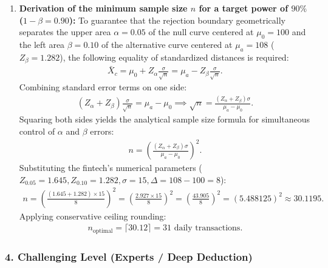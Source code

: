 \begin{solucion}
\begin{enumerate}
		\item \textbf{Derivation of the minimum sample size $n$ for a target power of $90\%$ ($1-\beta = 0.90$):}
		To guarantee that the rejection boundary geometrically separates the upper area $\alpha = 0.05$ of the null curve centered at $\mu_0 = 100$ and the left area $\beta = 0.10$ of the alternative curve centered at $\mu_a = 108$ ($Z_\beta = 1.282$), the following equality of standardized distances is required:
		\begin{align}
			\bar{X}_c = \mu_0 + Z_\alpha \frac{\sigma}{\sqrt{n}} = \mu_a - Z_\beta \frac{\sigma}{\sqrt{n}}.
		\end{align}
		Combining standard error terms on one side:
		\begin{align}
			(Z_\alpha + Z_\beta)\frac{\sigma}{\sqrt{n}} = \mu_a - \mu_0 \implies \sqrt{n} = \frac{(Z_\alpha + Z_\beta)\sigma}{\mu_a - \mu_0}.
		\end{align}
		Squaring both sides yields the analytical sample size formula for simultaneous control of $\alpha$ and $\beta$ errors:
		\begin{align}
			n = \left( \frac{(Z_\alpha + Z_\beta)\sigma}{\mu_a - \mu_0} \right)^2.
		\end{align}
		Substituting the fintech's numerical parameters ($Z_{0.05} = 1.645, Z_{0.10} = 1.282, \sigma = 15, \Delta = 108 - 100 = 8$):
		\begin{align}
			n = \left( \frac{(1.645 + 1.282) \times 15}{8} \right)^2 = \left( \frac{2.927 \times 15}{8} \right)^2 = \left( \frac{43.905}{8} \right)^2 = (5.488125)^2 \approx 30.1195.
		\end{align}
		Applying conservative ceiling rounding:
		\begin{align}
			n_{\text{optimal}} = \lceil 30.12 \rceil = 31 \text{ daily transactions.}
		\end{align}
	\end{enumerate}
\end{solucion}

\subsubsection*{4. Challenging Level (Experts / Deep Deduction)}

